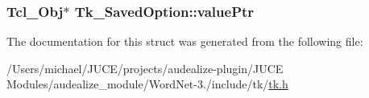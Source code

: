 \subsubsection[{\texorpdfstring{value\+Ptr}{valuePtr}}]{\setlength{\rightskip}{0pt plus 5cm}Tcl\+\_\+\+Obj$\ast$ Tk\+\_\+\+Saved\+Option\+::value\+Ptr}\hypertarget{struct_tk___saved_option_a49f053db9eeb33e8ecab8e2c534b73ab}{}\label{struct_tk___saved_option_a49f053db9eeb33e8ecab8e2c534b73ab}


The documentation for this struct was generated from the following file\+:\begin{DoxyCompactItemize}
\item 
/\+Users/michael/\+J\+U\+C\+E/projects/audealize-\/plugin/\+J\+U\+C\+E Modules/audealize\+\_\+module/\+Word\+Net-\/3./include/tk/\hyperlink{tk_8h}{tk.\+h}\end{DoxyCompactItemize}
